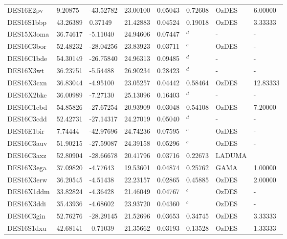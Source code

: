 \documentclass[fleqn,usenatbib,]{mnras}
\begin{document}
\begin{table}
\begin{threeparttable}
\begin{tabular}{llllllll}
DES16E2pv      &  9.20875 & -43.52782 & 23.00100 & 0.05043 & 0.72608 &      OzDES &       6.00000 \\
DES16S1bbp     & 43.26389 &   0.37149 & 21.42883 & 0.04524 & 0.19018 &      OzDES &       3.33333 \\
DES15X3oma     & 36.74617 &  -5.11040 & 24.94606 & 0.07447 &    $^d$ &          - &             - \\
DES16C3bor     & 52.48232 & -28.04256 & 23.83923 & 0.03711 &    $^c$ &      OzDES &             - \\
DES16C1bde     & 54.30149 & -26.75840 & 24.96313 & 0.09485 &    $^d$ &          - &             - \\
DES16X3wt      & 36.23751 &  -5.54488 & 26.90234 & 0.28423 &    $^d$ &          - &             - \\
DES16X3cxn     & 36.83044 &  -4.95100 & 23.05257 & 0.04442 & 0.58464 &      OzDES &      12.83333 \\
DES16X2bke     & 36.00989 &  -7.27130 & 25.13096 & 0.16403 &    $^d$ &          - &             - \\
DES16C1cbd     & 54.85826 & -27.67254 & 20.93909 & 0.03048 & 0.54108 &      OzDES &       7.20000 \\
DES16C3cdd     & 52.42731 & -27.14317 & 24.27019 & 0.05040 &    $^d$ &          - &             - \\
DES16E1bir     &  7.74444 & -42.97696 & 24.74236 & 0.07595 &    $^c$ &      OzDES &             - \\
DES16C3auv     & 51.90215 & -27.59087 & 24.39158 & 0.05296 &    $^c$ &      OzDES &             - \\
DES16C3axz     & 52.80904 & -28.66678 & 20.41796 & 0.03716 & 0.22673 &  LADUMA &               \\
DES16X3ega     & 37.09820 &  -4.77643 & 19.53601 & 0.04874 & 0.25762 &       GAMA &       1.00000 \\
DES16X3erw     & 36.20545 &  -4.51438 & 22.23157 & 0.02865 & 0.45885 &      OzDES &       2.00000 \\
DES16X1ddm     & 33.82824 &  -4.36428 & 21.46049 & 0.04767 &    $^c$ &      OzDES &             - \\
DES16X3ddi     & 35.43936 &  -4.68602 & 23.93720 & 0.04360 &    $^c$ &      OzDES &             - \\
DES16C3gin     & 52.76276 & -28.29145 & 21.52696 & 0.03653 & 0.34745 &      OzDES &       3.33333 \\
DES16S1dxu     & 42.68141 &  -0.71039 & 21.35662 & 0.03193 & 0.13528 &      OzDES &       1.33333 \\

\end{tabular}
\end{threeparttable}
\end{table}
\end{document}
